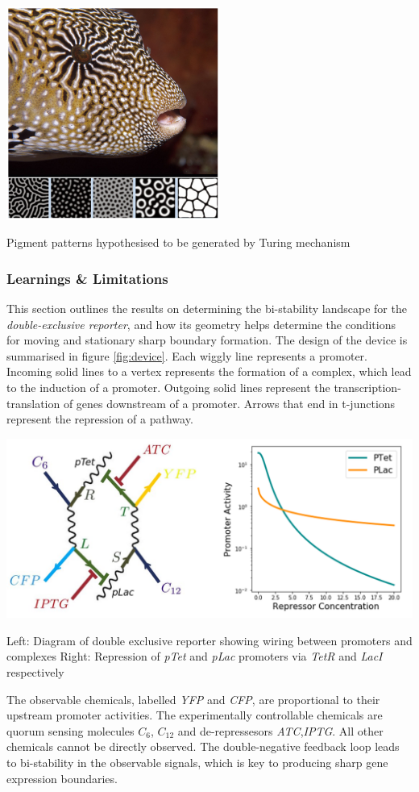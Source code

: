\begin{Figure}
\includegraphics[width=70mm]{figures/turing.png}
\caption{Pigment patterns hypothesised to be generated by Turing mechanism}
\label{fig:turing}
\end{Figure}

\subsubsection{Learnings \& Limitations}
This section outlines the results on determining the bi-stability landscape for the
\textit{double-exclusive reporter}, and how its geometry helps determine the conditions for
moving and stationary sharp boundary formation. The design of the device is summarised 
in figure \ref{fig:device}. Each wiggly line represents a promoter. Incoming solid lines
to a vertex represents the formation of a complex, which lead to the induction of a promoter.
Outgoing solid lines represent the transcription-translation of genes downstream of a
promoter. Arrows that end in t-junctions represent the repression of a pathway.

\begin{Figure}
\includegraphics[width=140mm]{figures/device.png}
\caption{Left: Diagram of double exclusive reporter showing wiring between promoters
and complexes Right: Repression of \textit{pTet} and \textit{pLac} promoters via
\textit{TetR} and \textit{LacI} respectively}
\label{fig:device}
\end{Figure}
\noindent
The observable chemicals, labelled \textit{YFP} and \textit{CFP}, are
proportional to their upstream promoter activities. The experimentally controllable chemicals
are quorum sensing molecules $C_6$, $C_{12}$ and de-repressesors \textit{ATC},\textit{IPTG}.
All other chemicals cannot be directly observed. The double-negative feedback loop leads
to bi-stability in the observable signals, which is key to producing sharp gene
expression boundaries.

